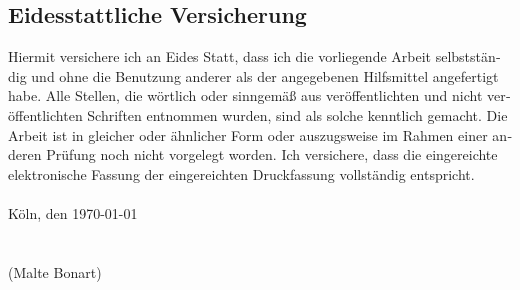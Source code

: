 \documentclass[a4paper, bibtotocnumbered,liststotoc,12pt,abstracton]{scrartcl}
\theoremstyle{definition}
\theoremstyle{remark}
\numberwithin{figure}{section}
\numberwithin{table}{section}
\numberwithin{equation}{section}
\begin{document}
\begin{otherlanguage}{ngerman}
	
	\section*{Eidesstattliche Versicherung}
	
	 Hiermit versichere ich an Eides Statt, dass ich die vorliegende Arbeit selbstständig und ohne die Benutzung anderer als der angegebenen Hilfsmittel angefertigt habe. Alle Stellen, die wörtlich oder sinngemäß aus veröffentlichten und nicht veröffentlichten Schriften entnommen wurden, sind als solche kenntlich gemacht. Die Arbeit ist in gleicher oder ähnlicher Form oder auszugsweise im Rahmen einer anderen Prüfung noch nicht vorgelegt worden. Ich versichere, dass die eingereichte elektronische Fassung der eingereichten Druckfassung vollständig entspricht. \\
	\\
	K\"oln, den \today
	\\
	\\
	\\
	(Malte Bonart)
\end{otherlanguage}


%
%
\end{document}
